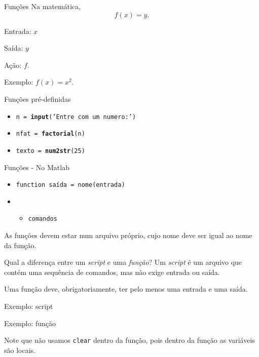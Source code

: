 \documentclass[hyperref={pdfpagelabels=false}]{beamer}
\begin{document}
\begin{frame}{Funções}
  Na matemática, 
	$$f(x) = y.$$
	
	Entrada: $x$
	
	Saída: $y$
	
	Ação: $f$.
	
	Exemplo: $f(x) = x^2$.
\end{frame}

\begin{frame}{Funções pré-definidas}
  \begin{itemize}
    \item \texttt{n = \textbf{input}('Entre com um numero:')}
    \item \texttt{nfat = \textbf{factorial}(n)}
    \item \texttt{texto = \textbf{num2str}(25)}
  \end{itemize}
\end{frame}

\begin{frame}{Funções - No Matlab}

  \begin{itemize}
  \item[] \texttt{function \alert{saída} = \alert{nome}(\alert{entrada})}
	\item[] \begin{itemize}
	\item[] \texttt{\alert{comandos}}
	\end{itemize}
	\end{itemize}
	As funções devem estar num arquivo próprio, cujo nome deve ser igual ao nome da função.
\end{frame}

\begin{frame}{Qual a diferença entre um \emph{script} e uma \emph{função}?}
  Um \emph{script} é um arquivo que contém uma sequência de comandos, mas não exige entrada ou saída.
  
  Uma função deve, obrigatoriamente, ter pelo menos uma entrada e uma saída.
\end{frame}

\begin{frame}{Exemplo: script}
  
\end{frame}

\begin{frame}{Exemplo: função}
  
  \vfill
	Note que não usamos {\texttt{clear}} dentro da função, pois dentro da função as variáveis são \alert{locais}.
\end{frame}
\end{document}
